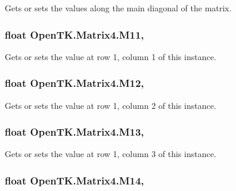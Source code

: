 Gets or sets the values along the main diagonal of the matrix. 

\hypertarget{struct_open_t_k_1_1_matrix4_aa259786339c04177b6d5718d48a56017}{
\subsubsection[{M11}]{\setlength{\rightskip}{0pt plus 5cm}float Open\-T\-K.\-Matrix4.\-M11\hspace{0.3cm}{\ttfamily [get]}, {\ttfamily [set]}}}\label{struct_open_t_k_1_1_matrix4_aa259786339c04177b6d5718d48a56017}


Gets or sets the value at row 1, column 1 of this instance. 

\hypertarget{struct_open_t_k_1_1_matrix4_a6e50271d00973f34189215067b99cc59}{
\subsubsection[{M12}]{\setlength{\rightskip}{0pt plus 5cm}float Open\-T\-K.\-Matrix4.\-M12\hspace{0.3cm}{\ttfamily [get]}, {\ttfamily [set]}}}\label{struct_open_t_k_1_1_matrix4_a6e50271d00973f34189215067b99cc59}


Gets or sets the value at row 1, column 2 of this instance. 

\hypertarget{struct_open_t_k_1_1_matrix4_ab22fd3db4c2335a90ff02f00d4215c79}{
\subsubsection[{M13}]{\setlength{\rightskip}{0pt plus 5cm}float Open\-T\-K.\-Matrix4.\-M13\hspace{0.3cm}{\ttfamily [get]}, {\ttfamily [set]}}}\label{struct_open_t_k_1_1_matrix4_ab22fd3db4c2335a90ff02f00d4215c79}


Gets or sets the value at row 1, column 3 of this instance. 

\hypertarget{struct_open_t_k_1_1_matrix4_a375c77b6bb356e904b4177543049f566}{
\subsubsection[{M14}]{\setlength{\rightskip}{0pt plus 5cm}float Open\-T\-K.\-Matrix4.\-M14\hspace{0.3cm}{\ttfamily [get]}, {\ttfamily [set]}}}\label{struct_open_t_k_1_1_matrix4_a375c77b6bb356e904b4177543049f566}


